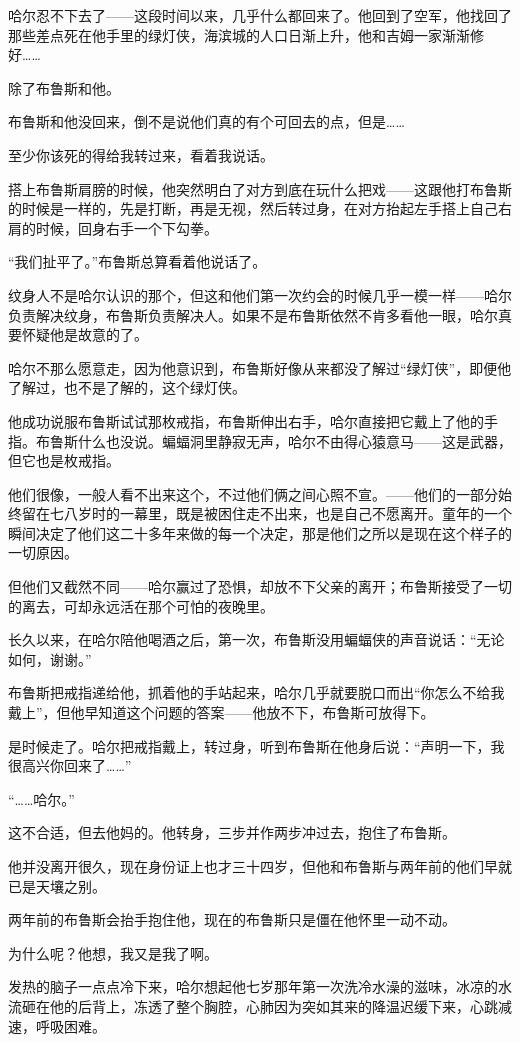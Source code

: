 \documentclass[../main]{subfiles}
\begin{document}
哈尔忍不下去了——这段时间以来，几乎什么都回来了。他回到了空军，他找回了那些差点死在他手里的绿灯侠，海滨城的人口日渐上升，他和吉姆一家渐渐修好……

除了布鲁斯和他。

布鲁斯和他没回来，倒不是说他们真的有个可回去的点，但是……

至少你该死的得给我转过来，看着我说话。

搭上布鲁斯肩膀的时候，他突然明白了对方到底在玩什么把戏——这跟他打布鲁斯的时候是一样的，先是打断，再是无视，然后转过身，在对方抬起左手搭上自己右肩的时候，回身右手一个下勾拳。

“我们扯平了。”布鲁斯总算看着他说话了。

纹身人不是哈尔认识的那个，但这和他们第一次约会的时候几乎一模一样——哈尔负责解决纹身，布鲁斯负责解决人。如果不是布鲁斯依然不肯多看他一眼，哈尔真要怀疑他是故意的了。

哈尔不那么愿意走，因为他意识到，布鲁斯好像从来都没了解过“绿灯侠”，即便他了解过，也不是了解的，这个绿灯侠。

他成功说服布鲁斯试试那枚戒指，布鲁斯伸出右手，哈尔直接把它戴上了他的手指。布鲁斯什么也没说。蝙蝠洞里静寂无声，哈尔不由得心猿意马——这是武器，但它也是枚戒指。

他们很像，一般人看不出来这个，不过他们俩之间心照不宣。——他们的一部分始终留在七八岁时的一幕里，既是被困住走不出来，也是自己不愿离开。童年的一个瞬间决定了他们这二十多年来做的每一个决定，那是他们之所以是现在这个样子的一切原因。

但他们又截然不同——哈尔赢过了恐惧，却放不下父亲的离开；布鲁斯接受了一切的离去，可却永远活在那个可怕的夜晚里。

长久以来，在哈尔陪他喝酒之后，第一次，布鲁斯没用蝙蝠侠的声音说话：“无论如何，谢谢。”

布鲁斯把戒指递给他，抓着他的手站起来，哈尔几乎就要脱口而出“你怎么不给我戴上”，但他早知道这个问题的答案——他放不下，布鲁斯可放得下。

是时候走了。哈尔把戒指戴上，转过身，听到布鲁斯在他身后说：“声明一下，我很高兴你回来了\ldots\ldots”

“……哈尔。”

这不合适，但去他妈的。他转身，三步并作两步冲过去，抱住了布鲁斯。

他并没离开很久，现在身份证上也才三十四岁，但他和布鲁斯与两年前的他们早就已是天壤之别。

两年前的布鲁斯会抬手抱住他，现在的布鲁斯只是僵在他怀里一动不动。

为什么呢？他想，我又是我了啊。

发热的脑子一点点冷下来，哈尔想起他七岁那年第一次洗冷水澡的滋味，冰凉的水流砸在他的后背上，冻透了整个胸腔，心肺因为突如其来的降温迟缓下来，心跳减速，呼吸困难。
\end{document}
